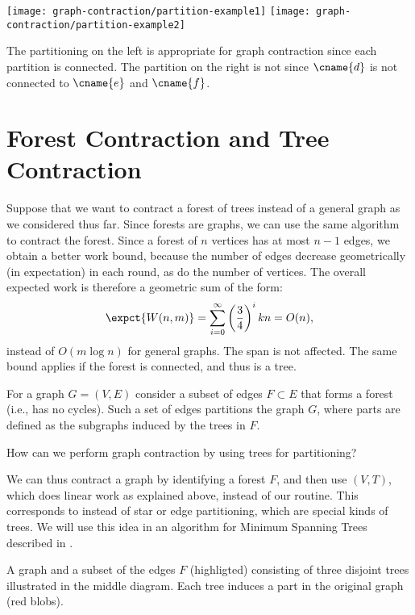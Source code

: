 {\begin{remark}
\begin{center}
\texttt{[image: graph-contraction/partition-example1]}
\hspace{1in}
\texttt{[image: graph-contraction/partition-example2]}

\end{center}
The partitioning on the left is appropriate for graph contraction since
each partition is connected.    The partition on the right is not
since $\cname{d}$ is not connected to $\cname{e}$ and $\cname{f}$.
\end{remark}



\section{Forest Contraction and Tree Contraction}
Suppose that we want to contract a forest of trees instead of  a
general graph as we considered thus far.
% 
Since forests are graphs, we can use the same 
algorithm to contract the forest.
%
Since a forest of $n$ vertices has at most $n-1$ edges, we obtain a
better work bound,  because the number of edges
decrease geometrically (in expectation) in each round, as do the
number of vertices.  
%
The overall expected work is therefore a
geometric sum of the form: 
%
\[
\expct{W(n,m)} = \sum_{i=0}^{\infty} \left(\frac{3}{4}\right)^i kn =
O(n),
\] 
%
instead of $O(m \log n)$ for
general graphs.  The span is not affected.
%
The same bound applies if the forest is connected, and thus is a tree.

For a graph $G = (V,E)$ consider a subset of edges $F \subset E$ that
forms a forest (i.e., has no cycles).  Such a set of edges partitions
the graph $G$, where parts are defined as the subgraphs induced by
the trees in $F$.
%
\begin{question}
How can we perform graph contraction by using trees for partitioning?
\end{question}
%
We can thus contract a graph by identifying a forest $F$, and then use
 $(V,T)$, which does
linear work as explained above, instead of our 
routine.  
%
This corresponds to  instead of star or edge
partitioning, which are special kinds of trees.
%
We will use this idea in an algorithm for Minimum Spanning
Trees described in .

\begin{example}
A graph and a subset of the edges $F$ (highligted) consisting of
three disjoint trees illustrated in the middle diagram.  Each tree
induces a part in the original graph (red blobs). 
 

\end{example}}
